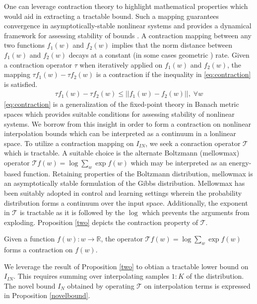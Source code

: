 \documentclass{article}
\begin{document}
One can leverage contraction theory \cite{banach, contraction} to highlight mathematical properties which would aid in extracting a tractable bound. Such a mapping guarantees convergence in asymptotically-stable nonlinear systems \cite{contraction} and provides a dynamical framework for assessing stability of bounds \cite{sql}. A contraction mapping between any two functions $f_{1}(w)$ and $f_{2}(w)$ implies that the norm distance between $f_{1}(w)$ and $f_{2}(w)$ decays at a constant (in some cases geometric \cite{banach}) rate. Given a contraction operator $\tau$ when iteratively applied on $f_{1}(w)$ and $f_{2}(w)$, the mapping $\tau f_{1}(w) - \tau f_{2}(w)$ is a contraction if the inequality in \autoref{eq:contraction} is satisfied.
\begin{gather}
  \tau f_{1}(w) - \tau f_{2}(w) \leq ||f_{1}(w) - f_{2}(w)||,\; \forall w \label{eq:contraction}
\end{gather} 
\autoref{eq:contraction} is a generalization of the fixed-point theory in Banach metric spaces \cite{contraction} which provides suitable conditions for assessing stability of nonlinear systems. We borrow from this insight in order to form a contraction on nonlinear interpolation bounds which can be interpreted as a continuum in a lonlinear space. To utilize a contraction mapping on $I_{IN}$, we seek a conraction operator $\mathcal{T}$ which is tractable. A suitable choice is the alternate Boltzmann (mellowmax) operator \cite{mellowmax} $\mathcal{T}f(w)=\log \sum_{w} \exp{f(w)}$ which may be interpreted as an energy-based function. Retaining properties of the Boltzmann distribution, mellowmax is an asymptotically stable formulation of the Gibbs distribution. Mellowmax has been suitably adopted in control and learning settings \cite{sql,emix} wherein the probability distribution forms a continuum over the input space. Additionally, the exponent in $\mathcal{T}$ is tractable as it is followed by the $\log$ which prevents the arguments from exploding. Proposition \autoref{two} depicts the contraction property of $\mathcal{T}$. 
\begin{customthm}{2}\label{two}
  Given a function $f(w):w\rightarrow \mathbb{R}$, the operator $\mathcal{T}f(w)=\log \sum_{w} \exp{f(w)}$ forms a contraction on $f(w)$. 
\end{customthm}
We leverage the result of Proposition \autoref{two} to obtian a tractable lower bound on $I_{IN}$. This requires summing over interpolating samples $1:K$ of the distribution. The novel bound $I_{N}$ obtained by operating $\mathcal{T}$ on interpolation terms is expressed in Proposition \autoref{novelbound}. 
\end{document}

